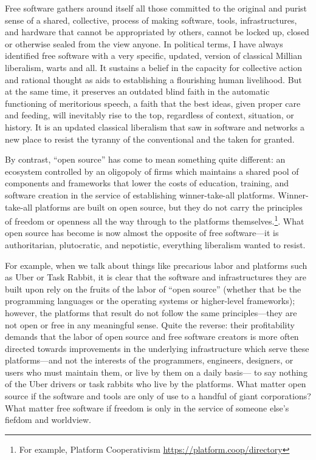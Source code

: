 \documentclass[11pt]{article}
\begin{document}
Free software gathers around itself all those committed to the original and purist sense of a shared, collective, process of making software, tools, infrastructures, and hardware that cannot be appropriated by others, cannot be locked up, closed or otherwise sealed from the view anyone.  In political terms, I have always identified free software with a very specific, updated, version of classical Millian liberalism, warts and all.  It sustains a belief in the capacity for collective action and rational thought as aids to establishing a flourishing human livelihood.  But at the same time, it preserves an outdated blind faith in the automatic functioning of meritorious speech, a faith that the best ideas, given proper care and feeding, will inevitably rise to the top, regardless of context, situation, or history.  It is an updated classical liberalism that saw in software and networks a new place to resist the tyranny of the conventional and the taken for granted.  

By contrast, ``open source'' has come to mean something quite different: an ecosystem controlled by an oligopoly of firms which maintains a shared pool of components and frameworks that lower the costs of education, training, and software creation in the service of establishing winner-take-all platforms.  Winner-take-all platforms are built on open source, but they do not carry the principles of freedom or openness all the way through to the platforms themselves.\footnote{For example, Platform Cooperativism \url{https://platform.coop/directory}}.  What open source has become is now almost the opposite of free software---it is authoritarian, plutocratic, and nepotistic, everything liberalism wanted to resist.

For example, when we talk about things like precarious labor and platforms such as Uber or Task Rabbit, it is clear that the software and infrastructures they are built upon rely on the fruits of the labor of ``open source'' (whether that be the programming languages or the operating systems or higher-level frameworks); however, the platforms that result do not follow the same principles---they are not open or free in any meaningful sense.  Quite the reverse: their profitability demands that the labor of open source and free software creators is more often directed towards improvements in the underlying infrastructure which serve these platforms---and not the interests of the programmers, engineers, designers, or users who must maintain them, or live by them on a daily basis--- to say nothing of the Uber drivers or task rabbits who live by the platforms.  What  matter open source if the software and tools are only of use to a handful of giant corporations?  What matter free software if freedom is only in the service of someone else's fiefdom and worldview. 
\end{document}
